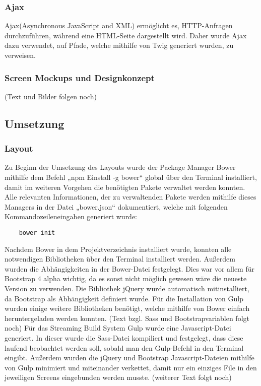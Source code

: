     \subsubsection{Ajax}

	Ajax(Asynchronous JavaScript and XML) ermöglicht es, HTTP-Anfragen durchzuführen, während eine HTML-Seite dargestellt wird. Daher wurde Ajax dazu verwendet, auf Pfade, welche mithilfe von Twig generiert wurden, zu verweisen.

    \subsubsection{Screen Mockups und Designkonzept}

	(Text und Bilder folgen noch)

  \subsection{Umsetzung}

    \subsubsection{Layout}

	Zu Beginn der Umsetzung des Layouts wurde der Package Manager Bower mithilfe dem Befehl „npm Einstall -g bower“ global über den Terminal installiert, damit im weiteren Vorgehen die benötigten Pakete verwaltet werden konnten. Alle relevanten Informationen, der zu verwaltenden Pakete werden mithilfe dieses Managers in der Datei „bower.json“ dokumentiert, welche mit folgenden Kommandozeileneingaben generiert wurde:
	\lstset{language = bash}
  	\begin{lstlisting}
  	bower init
  	\end{lstlisting}
	Nachdem Bower in dem Projektverzeichnis installiert wurde, konnten alle notwendigen Bibliotheken über den Terminal installiert werden. Außerdem wurden die Abhängigkeiten in der Bower-Datei festgelegt. Dies war vor allem für Bootstrap 4 alpha wichtig, da es sonst nicht möglich gewesen wäre die neueste Version zu verwenden. Die Bibliothek jQuery wurde automatisch mitinstalliert, da Bootstrap als Abhängigkeit definiert wurde. Für die Installation von Gulp wurden einige weitere Bibliotheken benötigt, welche mithilfe von Bower einfach heruntergeladen werden konnten.
	(Text bzgl. Sass und Bootstrapvariablen folgt noch)
	Für das Streaming Build System Gulp wurde eine Javascript-Datei generiert. In dieser wurde die Sass-Datei kompiliert und festgelegt, dass diese laufend beobachtet werden soll, sobald man den Gulp-Befehl in den Terminal eingibt. Außerdem wurden die jQuery und Bootstrap Javascript-Dateien mithilfe von Gulp minimiert und miteinander verkettet, damit nur ein einziges File in den jeweiligen Screens eingebunden werden musste.
	(weiterer Text folgt noch)

